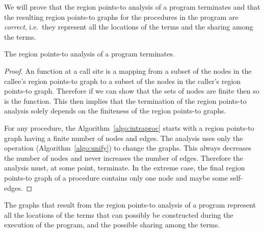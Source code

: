 \documentclass{tlp}
\begin{document}
We will prove that the region points-to analysis of a program terminates
and that the resulting region points-to graphs
for the procedures in the program are \emph{correct},
i.e.\ they represent all the locations of the terms
and the sharing among the terms.

\begin{theorem}
\label{theorem:termination}
The region points-to analysis of a program terminates.
\end{theorem}
\begin{proof}
An  function at a call site is a mapping
from a subset of the nodes in the callee's region points-to graph
to a subset of the nodes in the caller's region points-to graph.
Therefore if we can show that the sets of nodes are finite
then so is the  function.
This then implies that the termination
of the region points-to analysis solely depends on
the finiteness of the region points-to graphs.

For any procedure, the Algorithm~\ref{algo:intraproc}
starts with a region points-to graph
having a finite number of nodes and edges.
The analysis uses only the  operation
(Algorithm~\ref{algo:unify}) to change the graphs.
This always decreases the number of nodes
and never increases the number of edges.
Therefore the analysis must, at some point, terminate.
In the extreme case,
the final region points-to graph of a procedure
contains only one node and maybe some self-edges.
\end{proof}

\begin{theorem}
\label{theorem:loc_and_sharing}
The graphs that result from the region points-to analysis of a program
represent all the locations of the terms
that can possibly be constructed during the execution of the program,
and the possible sharing among the terms.
\end{theorem}
\end{document}
